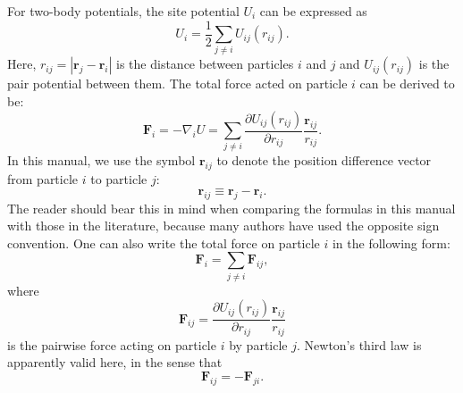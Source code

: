\documentclass[12pt,a4paper]{report}
\newcommand{\vect}[1]{\boldsymbol{#1}}
\begin{document}
For two-body potentials, the site potential $U_i$ can be expressed as
\begin{equation}
\label{equation:U_i}
U_i= \frac{1}{2} \sum_{j \neq i} U_{ij}(r_{ij}).
\end{equation}
Here, $r_{ij} = |\vect{r}_j - \vect{r}_i|$ is the distance between particles $i$ and $j$ and $U_{ij}(r_{ij})$ is the pair potential between them.
The total force acted on particle $i$ can be derived to be:
\begin{equation}
\vect{F}_{i} = -\nabla_i U = \sum_{j \neq i}
\frac{\partial U_{ij}(r_{ij})}{\partial r_{ij}}
\frac{\vect{r}_{ij} }{r_{ij}}.
\end{equation}
In this manual, we use the symbol $\vect{r}_{ij}$ to denote the position difference vector from particle $i$ to particle $j$:
\begin{equation}
\boxed{\vect{r}_{ij} \equiv \vect{r}_j - \vect{r}_i}.
\end{equation}
The reader should bear this in mind when comparing the formulas in this manual with those in the literature, because many authors have used the opposite sign convention. One can also write the total force on particle $i$ in the following form:
\begin{equation}
\vect{F}_{i} = \sum_{j \neq i} \vect{F}_{ij},
\end{equation}
where
\begin{equation}
\vect{F}_{ij} =
\frac{\partial U_{ij}(r_{ij})}{\partial r_{ij}}
\frac{\vect{r}_{ij} }{r_{ij}}
\end{equation}
is the pairwise force acting on particle $i$ by particle $j$. Newton's third law is apparently valid here, in the sense that
\begin{equation}
\vect{F}_{ij} = - \vect{F}_{ji}.
\end{equation}
\end{document}
